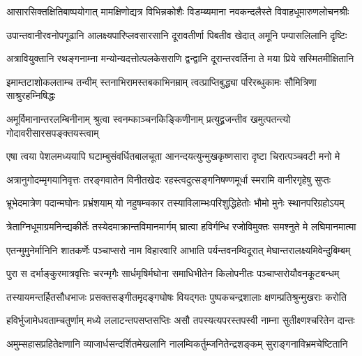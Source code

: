 \fourlineindentedshloka
{आसारसिक्तक्षितिबाष्पयोगात्}
{मामक्षिणोद्यत्र विभिन्नकोशैः}
{विडम्ब्यमाना नवकन्दलैस्ते}
{विवाहधूमारुणलोचनश्रीः} %

\fourlineindentedshloka
{उपान्तवानीरवनोपगूढानि}
{आलक्ष्यपारिप्लवसारसानि}
{दूरावतीर्णा पिबतीव खेदात्}
{अमूनि पम्पासलिलानि दृष्टिः} %

\fourlineindentedshloka
{अत्रावियुक्तानि रथङ्गनाम्ना}
{मन्योन्यदत्तोत्पलकेसराणि}
{द्वन्द्वानि दूरान्तरवर्तिना ते}
{मया प्रिये सस्मितमीक्षितानि} %

\fourlineindentedshloka
{इमाम्तटाशोकलताम्च तन्वीम्}
{स्तनाभिरामस्तबकाभिनम्राम्}
{त्वत्प्राप्तिबुद्ध्या परिरब्धुकामः}
{सौमित्रिणा साश्रुरहम्निषिद्धः} %

\fourlineindentedshloka
{अमूर्विमानान्तरलम्बिनीनाम्}
{श्रुत्वा स्वनम्काञ्चनकिङ्किणीनाम्}
{प्रत्युद्व्रजन्तीव खमुत्पतन्त्यो}
{गोदावरीसारसपङ्क्तयस्त्वाम्} %

\fourlineindentedshloka
{एषा त्वया पेशलमध्ययापि}
{घटाम्बुसंवर्धितबालचूता}
{आनन्दयत्युन्मुखकृष्णसारा}
{दृष्टा चिरात्पञ्चवटी मनो मे} %

\fourlineindentedshloka
{अत्रानुगोदम्मृगयानिवृत्तः}
{तरङ्गवातेन विनीतखेदः}
{रहस्त्वदुत्सङ्गनिषण्णमूर्धा}
{स्मरामि वानीरगृहेषु सुप्तः} %

\fourlineindentedshloka
{भ्रूभेदमात्रेण पदान्मघोनः}
{प्रभ्रंशयाम् यो नहुषम्चकार}
{तस्याविलाम्भःपरिशुद्धिहेतोः}
{भौमो मुनेः स्थानपरिग्रहोऽयम्} %

\fourlineindentedshloka
{त्रेताग्निधूमाग्रमनिन्द्यकीर्तेः}
{तस्येदमाक्रान्तविमानमार्गम्}
{घ्रात्वा हविर्गन्धि रजोविमुक्तः}
{समश्नुते मे लघिमानमात्मा} %

\fourlineindentedshloka
{एतन्मुमुनेर्मानिनि शातकर्णेः}
{पञ्चाप्सरो नाम विहारवारि}
{आभाति पर्यन्तवनम्विदूरात्}
{मेघान्तरालक्ष्यमिवेन्दुबिम्बम्} %

\fourlineindentedshloka
{पुरा स दर्भाङ्कुरमात्रवृत्तिः}
{चरन्मृगैः सार्धमृषिर्मघोना}
{समाधिभीतेन किलोपनीतः}
{पञ्चाप्सरोयौवनकूटबन्धम्} %

\fourlineindentedshloka
{तस्यायमन्तर्हितसौधभाजः}
{प्रसक्तसङ्गीतमृदङ्गघोषः}
{वियद्गतः पुष्पकचन्द्रशालाः}
{क्षणम्प्रतिश्रुन्मुखराः करोति} %

\fourlineindentedshloka
{हविर्भुजामेधवताम्चतुर्णाम्}
{मध्ये ललाटन्तपसप्तसप्तिः}
{असौ तपस्यत्यपरस्तपस्वी}
{नाम्ना सुतीक्ष्णश्चरितेन दान्तः} %

\fourlineindentedshloka
{अमुम्सहासप्रहितेक्षणानि}
{व्याजार्धसन्दर्शितमेखलानि}
{नालम्विकर्तुम्जनितेन्द्रशङ्कम्}
{सुराङ्गनाविभ्रमचेष्टितानि} %


